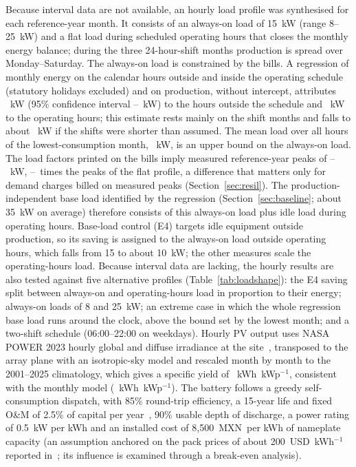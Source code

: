 \documentclass[processes,article,submit,pdftex,moreauthors]{Definitions/mdpi}
\newcommand{\MXN}{MXN}
\begin{document}
Because interval data are not available, an hourly load profile was synthesised for each reference-year month. It consists of an always-on load of 15~kW (range 8--25~kW) and a flat load during scheduled operating hours that closes the monthly energy balance; during the three 24-hour-shift months production is spread over Monday--Saturday. The always-on load is constrained by the bills. A regression of monthly energy on the calendar hours outside and inside the operating schedule (statutory holidays excluded) and on production, without intercept, attributes \nBCAon~kW (95\% confidence interval \nBCAonLo--\nBCAonHi~kW) to the hours outside the schedule and \nBCOp~kW to the operating hours; this estimate rests mainly on the shift months and falls to about \nBCAonShort~kW if the shifts were shorter than assumed. The mean load over all hours of the lowest-consumption month, \nBCLowMonth~kW, is an upper bound on the always-on load. The load factors printed on the bills imply measured reference-year peaks of \nBCPeakLo--\nBCPeakHi~kW, \nBCRatioLo--\nBCRatioHi\ times the peaks of the flat profile, a difference that matters only for demand charges billed on measured peaks (Section~\ref{sec:resil}). The production-independent base load identified by the regression (Section~\ref{sec:baseline}; about 35~kW on average) therefore consists of this always-on load plus idle load during operating hours. Base-load control (E4) targets idle equipment outside production, so its saving is assigned to the always-on load outside operating hours, which falls from 15 to about 10~kW; the other measures scale the operating-hours load. Because interval data are lacking, the hourly results are also tested against five alternative profiles (Table~\ref{tab:loadshape}): the E4 saving split between always-on and operating-hours load in proportion to their energy; always-on loads of 8 and 25~kW; an extreme case in which the whole regression base load runs around the clock, above the bound set by the lowest month; and a two-shift schedule (06:00--22:00 on weekdays). Hourly PV output uses NASA POWER 2023 hourly global and diffuse irradiance at the site~\cite{nasapower}, transposed to the array plane with an isotropic-sky model and rescaled month by month to the 2001--2025 climatology, which gives a specific yield of \nSpecYieldHourly~kWh~kWp$^{-1}$, consistent with the monthly model (\nSpecYield~kWh~kWp$^{-1}$). The battery follows a greedy self-consumption dispatch, with 85\% round-trip efficiency, a 15-year life and fixed O\&M of 2.5\% of capital per year~\cite{nrel2024atb}, 90\% usable depth of discharge, a power rating of 0.5~kW per kWh and an installed cost of 8,500~\MXN\ per kWh of nameplate capacity (an assumption anchored on the pack prices of about 200~USD~kWh$^{-1}$ reported in~\cite{nrel2024atb}; its influence is examined through a break-even analysis).
\end{document}
